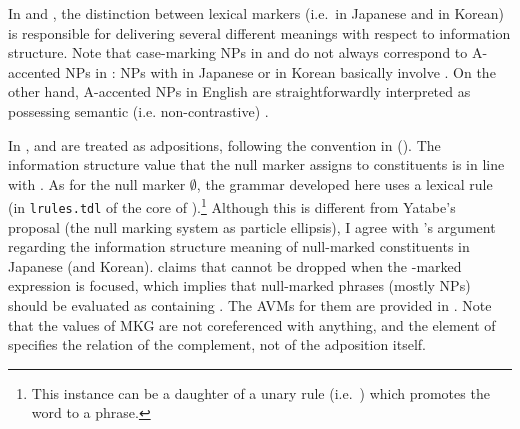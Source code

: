 In  and , the distinction between lexical
markers (i.e.\ \ga \vs \wa in Japanese and \ika \vs \nun in Korean)
is responsible for delivering several different meanings with respect
to information structure. Note that case-marking NPs in  and
 do not always correspond to A-accented NPs in
: NPs with \ga in Japanese or \ika in Korean
basically involve . On the other hand, A-accented NPs
in English are straightforwardly interpreted as possessing semantic
(i.e. non-contrastive) .









In , \ga and \wa are treated as adpositions,
following the convention in  (\citealt{siegel:etal:16}).
The information structure value that the null marker assigns to
constituents is in line with \citet{yatabe:99}.  As for the null
marker \ensuremath{\emptyset}, the grammar developed here uses a lexical rule (in
\texttt{lrules.tdl} of the core of \lingo {}).\footnote{This instance can be a daughter of a unary rule
  (i.e.\ ) which promotes the word to a phrase.}
Although this is different from Yatabe's proposal (the null marking
system as particle ellipsis), I agree with \citeauthor{yatabe:99}'s
argument regarding the information structure meaning of null-marked
constituents in Japanese (and Korean). \citeauthor{yatabe:99} claims
that \ga cannot be dropped when the {\ga}-marked expression is
focused, which implies that null-marked phrases (mostly NPs) should be
evaluated as containing .  The AVMs for them are
provided in . Note that the values
of MKG are not coreferenced with anything, and the element of
 specifies the relation of the complement, not of the
adposition itself.





